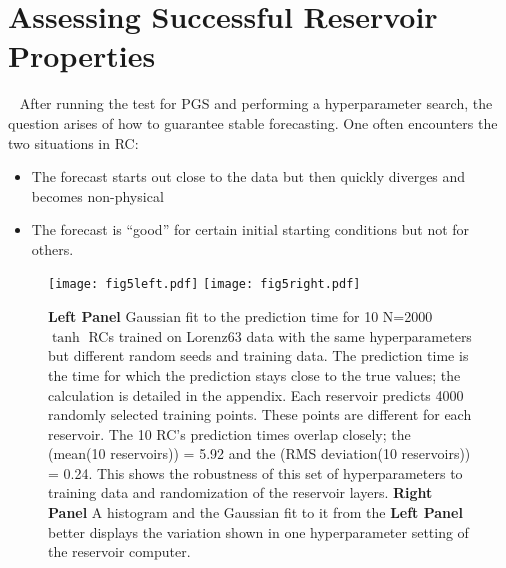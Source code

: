 \documentclass[12pt]{article}
\begin{document}


 
\section{Assessing Successful Reservoir Properties} \label{sec: eval}~\label{assess}
After running the test for PGS and performing a hyperparameter search, the question arises of how to guarantee stable forecasting.  One often encounters the two situations in RC:
\begin{itemize}
    \item The forecast starts out close to the data but then quickly diverges and becomes non-physical
    \item The forecast is ``good'' for certain initial starting conditions but not for others.
\end{itemize}

\begin{figure}[htpb!]
    \centering
    \texttt{[image: fig5left.pdf]}
    \texttt{[image: fig5right.pdf]}
    \caption{{\bf Left Panel} Gaussian fit to the prediction time for 10 N=2000 $\tanh$ RCs trained on Lorenz63 data with the same hyperparameters but different random seeds and training data.  The prediction time is the time for which the prediction stays close to the true values; the calculation is detailed in the appendix. Each reservoir predicts 4000 randomly selected training points. These points are different for each reservoir.  The 10 RC's prediction times overlap closely; the (mean(10 reservoirs)) = 5.92 and the (RMS deviation(10 reservoirs)) = 0.24.  This shows the robustness of this set of hyperparameters to training data and randomization of the reservoir layers. {\bf Right Panel} A histogram and the Gaussian fit to it from the {\bf Left Panel} better displays the variation shown in one hyperparameter setting of the reservoir computer.}
    \label{fig: robust}
\end{figure}
\end{document}
